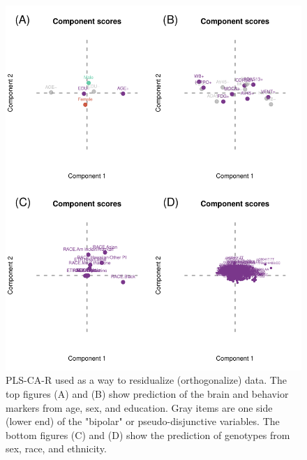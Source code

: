 \documentclass[12pt]{article}
\begin{document}
\begin{figure}[!hbtp]

{\centering \includegraphics[width=.8\textwidth,height=.8\textheight]{PLSCAR_to_a_GPLS_files/figure-latex/unnamed-chunk-8-1} 

}

\caption{\label{fig:confound_predictors_ex2} PLS-CA-R used as a way to residualize (orthogonalize) data. The top figures (A) and (B) show prediction of the brain and behavior markers from age, sex, and education. Gray items are one side (lower end) of the "bipolar" or pseudo-disjunctive variables. The bottom figures (C) and (D) show the prediction of genotypes from sex, race, and ethnicity.}\label{fig:unnamed-chunk-8}
\end{figure}
\end{document}
